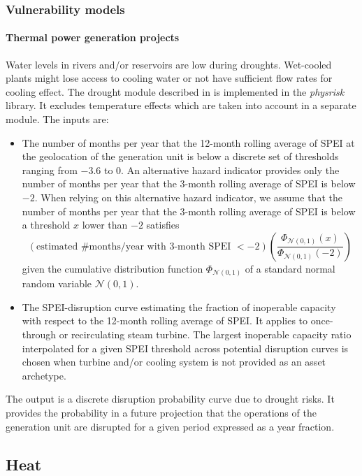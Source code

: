 \documentclass[a4paper,11pt]{extarticle} %
\theoremstyle{definition}
\begin{document}
\subsubsection{Vulnerability models}

\paragraph{Thermal power generation projects}
Water levels in rivers and/or reservoirs are low during droughts. Wet-cooled plants might lose access to cooling water or not have sufficient flow rates for cooling effect. The drought module described in \cite{LuoEtAl:2021,LuoEtAl:2023} is implemented in the \emph{physrisk} library. It excludes temperature effects which are taken into account in a separate module. The inputs are:
\begin{itemize}
\item The number of months per year that the 12-month rolling average of SPEI at the geolocation of the generation unit is below a discrete set of thresholds ranging from $-3.6$ to $0$. An alternative hazard indicator provides only the number of months per year that the 3-month rolling average of SPEI is below $-2$. When relying on this alternative hazard indicator, we assume that the number of months per year that the 3-month rolling average of SPEI is below a threshold $x$ lower than $-2$ satisfies
$$
\left(\text{estimated \#months/year with 3-month SPEI $<-2$}\right)\left(\frac{\Phi_{\mathcal{N}\left(0,1\right)}\left(x\right)}{\Phi_{\mathcal{N}\left(0,1\right)}\left(-2\right)}\right)
$$
given the cumulative distribution function $\Phi_{\mathcal{N}\left(0,1\right)}$ of a standard normal random variable $\mathcal{N}\left(0,1\right)$.
\item The SPEI-disruption curve estimating the fraction of inoperable capacity with respect to the 12-month rolling average of SPEI. It applies to once-through or recirculating steam turbine. The largest inoperable capacity ratio interpolated for a given SPEI threshold across potential disruption curves is chosen when turbine and/or cooling system is not provided as an asset archetype.
\end{itemize}
The output is a discrete disruption probability curve due to drought risks. It provides the probability in a future projection that the operations of the generation unit are disrupted for a given period expressed as a year fraction.

\subsection{Heat}
\end{document}

